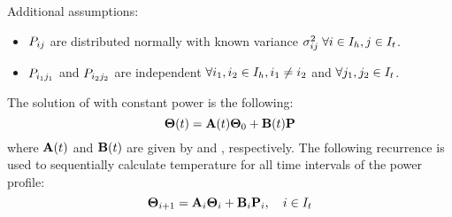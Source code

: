 Additional assumptions:
\begin{itemize}
  \item $P_{ij}$ are distributed normally with known variance $\sigma_{ij}^2 \; \forall i \in I_h, j \in I_t$.
  \item $P_{i_1 j_1}$ and $P_{i_2 j_2}$ are independent $\forall i_1, i_2 \in I_h,  i_1 \neq i_2$ and $\forall j_1, j_2 \in I_t$.
\end{itemize}

The solution of  with constant power is the following:
\[
  \mathbf{\Theta}(t) = \mathbf{A}(t) \mathbf{\Theta}_0 + \mathbf{B}(t) \mathbf{P}
\]
where $\mathbf{A}(t)$ and $\mathbf{B}(t)$ are given by  and , respectively. The following recurrence is used to sequentially calculate temperature for all time intervals of the power profile:
\begin{equation} \equlabel{fourier-recurrence}
  \vtemperature_{i + 1} = \m{A}_i \vtemperature_i + \m{B}_i \vpower_i, \sep i \in \timeindex
\end{equation}

